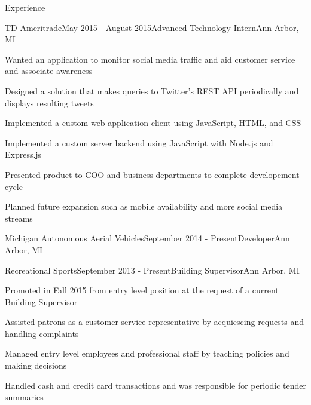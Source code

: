 \documentclass{resume} %
\begin{document}
\begin{rSection}{Experience}

\begin{rSubsection}{TD Ameritrade}{May 2015 - August 2015}{Advanced Technology Intern}{Ann Arbor, MI}
    \item Wanted an application to monitor social media traffic and aid customer service and associate awareness
    \item Designed a solution that makes queries to Twitter's REST API periodically and displays resulting tweets
    \item Implemented a custom web application client using JavaScript, HTML, and CSS
    \item Implemented a custom server backend using JavaScript with Node.js and Express.js
    \item Presented product to COO and business departments to complete developement cycle
    \item Planned future expansion such as mobile availability and more social media streams
\end{rSubsection}


\begin{rSubsection}{Michigan Autonomous Aerial Vehicles}{September 2014 - Present}{Developer}{Ann Arbor, MI}
    \item
    \item
    \item
    \item
\end{rSubsection}


\begin{rSubsection}{Recreational Sports}{September 2013 - Present}{Building Supervisor}{Ann Arbor, MI}
    \item Promoted in Fall 2015 from entry level position at the request of a current Building Supervisor
    \item Assisted patrons as a customer service representative by acquiescing requests and handling complaints
    \item Managed entry level employees and professional staff by teaching policies and making decisions
    \item Handled cash and credit card transactions and was responsible for periodic tender summaries
\end{rSubsection}

\end{rSection}
\end{document}
